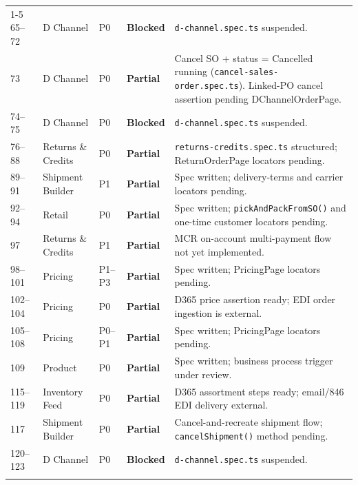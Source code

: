 \documentclass[a4paper,11pt]{article}
\begin{document}
\begin{longtable}{p{} p{} p{} p{} p{}}
\cmidrule{1-5}
65--72 & D Channel & P0 & \textcolor{statusYellow}{\textbf{Blocked}} & \texttt{d-channel.spec.ts} suspended. \\\relax
\cmidrule{1-5}
73 & D Channel & P0 & \textcolor{statusYellow}{\textbf{Partial}} & Cancel SO + status = Cancelled running (\texttt{cancel-sales-order.spec.ts}). Linked-PO cancel assertion pending DChannelOrderPage. \\\relax
\cmidrule{1-5}
74--75 & D Channel & P0 & \textcolor{statusYellow}{\textbf{Blocked}} & \texttt{d-channel.spec.ts} suspended. \\\relax
\cmidrule{1-5}
76--88 & Returns \& Credits & P0 & \textcolor{statusYellow}{\textbf{Partial}} & \texttt{returns-credits.spec.ts} structured; ReturnOrderPage locators pending. \\\relax
\cmidrule{1-5}
89--91 & Shipment Builder & P1 & \textcolor{statusYellow}{\textbf{Partial}} & Spec written; delivery-terms and carrier locators pending. \\\relax
\cmidrule{1-5}
92--94 & Retail & P0 & \textcolor{statusYellow}{\textbf{Partial}} & Spec written; \texttt{pickAndPackFromSO()} and one-time customer locators pending. \\\relax
\cmidrule{1-5}
97 & Returns \& Credits & P1 & \textcolor{statusYellow}{\textbf{Partial}} & MCR on-account multi-payment flow not yet implemented. \\\relax
\cmidrule{1-5}
98--101 & Pricing & P1--P3 & \textcolor{statusYellow}{\textbf{Partial}} & Spec written; PricingPage locators pending. \\\relax
\cmidrule{1-5}
102--104 & Pricing & P0 & \textcolor{statusYellow}{\textbf{Partial}} & D365 price assertion ready; EDI order ingestion is external. \\\relax
\cmidrule{1-5}
105--108 & Pricing & P0--P1 & \textcolor{statusYellow}{\textbf{Partial}} & Spec written; PricingPage locators pending. \\\relax
\cmidrule{1-5}
109 & Product & P0 & \textcolor{statusYellow}{\textbf{Partial}} & Spec written; business process trigger under review. \\\relax
\cmidrule{1-5}
115--119 & Inventory Feed & P0 & \textcolor{statusYellow}{\textbf{Partial}} & D365 assortment steps ready; email/846 EDI delivery external. \\\relax
\cmidrule{1-5}
117 & Shipment Builder & P0 & \textcolor{statusYellow}{\textbf{Partial}} & Cancel-and-recreate shipment flow; \texttt{cancelShipment()} method pending. \\\relax
\cmidrule{1-5}
120--123 & D Channel & P0 & \textcolor{statusYellow}{\textbf{Blocked}} & \texttt{d-channel.spec.ts} suspended. \\\relax
\cmidrule{1-5}
\bottomrule
\end{longtable}
\end{document}
